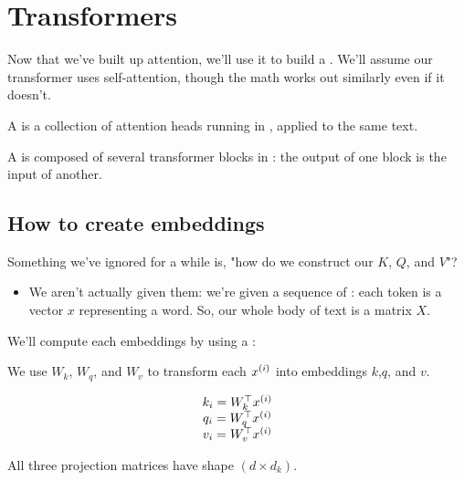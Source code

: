     
\pagebreak

\section{Transformers}

    Now that we've built up attention, we'll use it to build a . We'll assume our transformer uses self-attention, though the math works out similarly even if it doesn't.\\

    \begin{definition}
         A  is a collection of attention heads running in , applied to the same text.

         A  is composed of several transformer blocks in : the output of one block is the input of another.
    \end{definition}


    \subsection{How to create embeddings}

        Something we've ignored for a while is, "how do we construct our  $K$, $Q$, and $V$"? 
        
        \begin{itemize}
            \item We aren't actually given them: we're given a sequence of : each token is a vector $x$ representing a word. So, our whole body of text is a matrix $X$.
        \end{itemize}

        We'll compute each embeddings by using a :\\

        \begin{kequation}
            We use  $W_k$, $W_q$, and $W_v$ to transform each  $x^{(i)}$ into embeddings $k$,$q$, and $v$.

            $$
            \begin{matrix}
                k_i = W_k^\top x^{(i)} \\
                q_i = W_q^\top x^{(i)} \\ 
                v_i = W_v^\top x^{(i)} 
            \end{matrix}$$

            All three projection matrices have shape $(d \times d_k)$. 
        \end{kequation}

